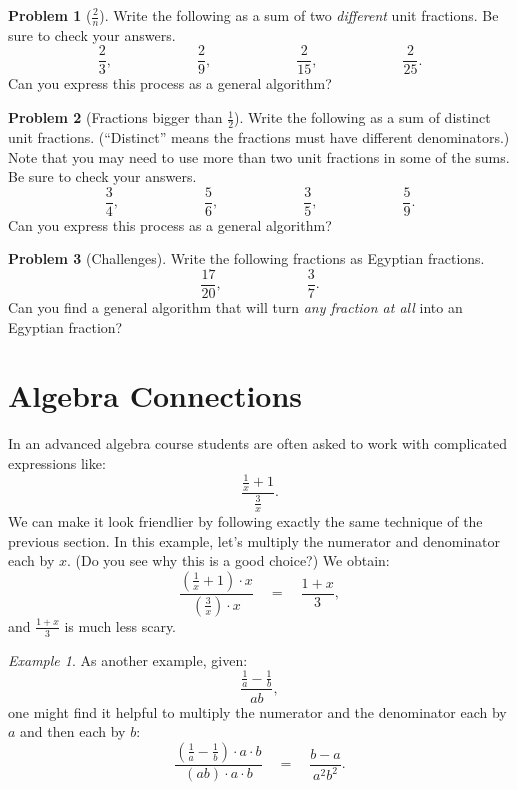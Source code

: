 \documentclass[10pt, reqno]{amsart}
\theoremstyle{remark}
\newtheorem{example}[thm]{Example}
\theoremstyle{definition}
\newtheorem{problem}{Problem}
\numberwithin{equation}{section}  %
\begin{document}
\begin{problem}[$\frac 2 n$]
Write the following as a sum of two \emph{different} unit fractions.  Be sure to check your answers.
\[
\frac 2 3,
\qquad\qquad\qquad
\frac 2 9,
\qquad\qquad\qquad
\frac 2 {15},
\qquad\qquad\qquad
\frac 2{25}.
\]
Can you express this process as a general algorithm?


\end{problem}


\begin{problem}[Fractions bigger than $\frac 1 2$]
Write the following as a sum of distinct unit fractions.  (``Distinct'' means the fractions must have different  denominators.)  Note that you may need to use more than two unit fractions in some of the sums.  Be sure to check your answers.
\[
\frac 3 4,
\qquad\qquad\qquad
\frac 5 6,
\qquad\qquad\qquad
\frac 3 5,
\qquad\qquad\qquad
\frac 5 9.
\]
Can you express this process as a general algorithm?


\end{problem}






\begin{problem}[Challenges]
Write the following fractions as Egyptian fractions.  
\[
\frac{17}{20},
\qquad\qquad\qquad
\frac 3 7.
\]
Can you find a general algorithm that will turn \emph{any fraction at all} into an Egyptian fraction?


\end{problem}






\section{Algebra Connections}
In an advanced algebra course students are often asked to work with complicated
expressions like:
\[
\frac{\frac 1 x + 1}{\frac 3 x}.
\]
We can make it look friendlier by following exactly the same technique of the
previous section. In this example, let's multiply the numerator and denominator each
by $x$. (Do you see why this is a good choice?) We obtain:
\[
\frac{\left(\frac 1 x + 1\right)\cdot x}{\left(\frac 3 x\right)\cdot x}
\quad
=
\quad
\frac{1+x}{3},
\]
and $\frac{1+x}{3}$ is much less scary.

\begin{example}
As another example, given:
\[
\frac{\frac 1 a - \frac 1 b}{ab},
\]
one might find it helpful to multiply the numerator and the denominator each
by $a$ and then each by $b$:
\[
\frac{\left(\frac 1 a - \frac 1 b\right)\cdot a \cdot b}{\left(ab\right)\cdot a \cdot b}
\quad
=
\quad
\frac{b-a}{a^2b^2}.
\]

\end{example}
\end{document}
